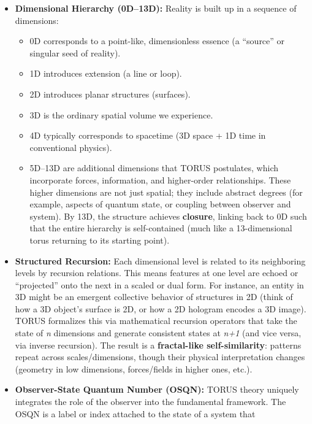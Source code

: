 \documentclass[]{article}
\begin{document}
\begin{itemize}
\item
  \textbf{Dimensional Hierarchy (0D--13D):} Reality is built up in a
  sequence of dimensions:

  \begin{itemize}
  \item
    0D corresponds to a point-like, dimensionless essence (a ``source''
    or singular seed of reality).
  \item
    1D introduces extension (a line or loop).
  \item
    2D introduces planar structures (surfaces).
  \item
    3D is the ordinary spatial volume we experience.
  \item
    4D typically corresponds to spacetime (3D space + 1D time in
    conventional physics).
  \item
    5D--13D are additional dimensions that TORUS postulates, which
    incorporate forces, information, and higher-order relationships.
    These higher dimensions are not just spatial; they include abstract
    degrees (for example, aspects of quantum state, or coupling between
    observer and system). By 13D, the structure achieves
    \textbf{closure}, linking back to 0D such that the entire hierarchy
    is self-contained (much like a 13-dimensional torus returning to its
    starting point).
  \end{itemize}
\item
  \textbf{Structured Recursion:} Each dimensional level is related to
  its neighboring levels by recursion relations. This means features at
  one level are echoed or ``projected'' onto the next in a scaled or
  dual form. For instance, an entity in 3D might be an emergent
  collective behavior of structures in 2D (think of how a 3D object's
  surface is 2D, or how a 2D hologram encodes a 3D image). TORUS
  formalizes this via mathematical recursion operators that take the
  state of \emph{n} dimensions and generate consistent states at
  \emph{n+1} (and vice versa, via inverse recursion). The result is a
  \textbf{fractal-like self-similarity}: patterns repeat across
  scales/dimensions, though their physical interpretation changes
  (geometry in low dimensions, forces/fields in higher ones, etc.).
\item
  \textbf{Observer-State Quantum Number (OSQN):} TORUS theory uniquely
  integrates the role of the observer into the fundamental framework.
  The OSQN is a label or index attached to the state of a system that

\end{itemize}
\end{document}
